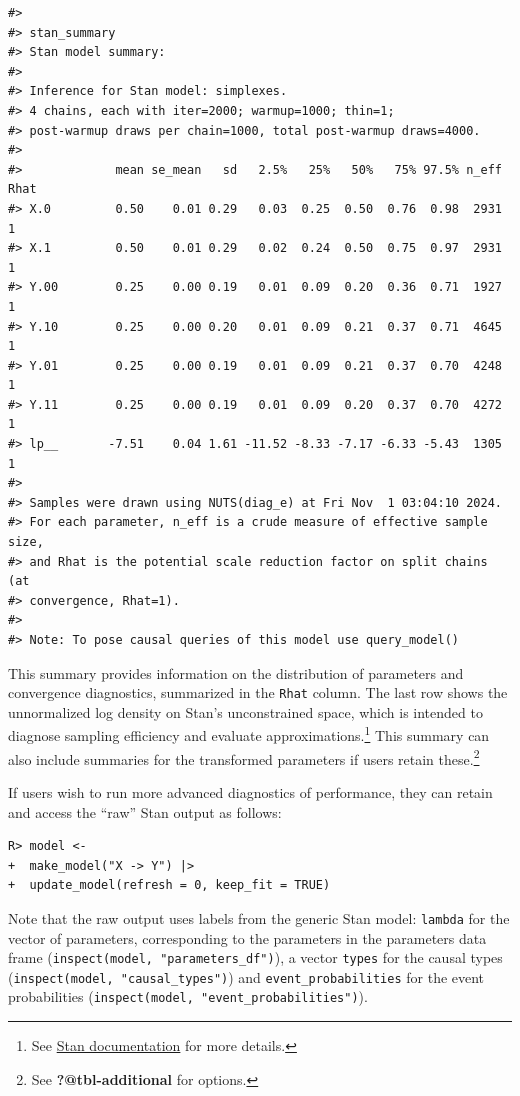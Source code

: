 \documentclass[
  11pt,
  article]{jss}
\begin{document}
\begin{verbatim}
#> 
#> stan_summary
#> Stan model summary:
#> 
#> Inference for Stan model: simplexes.
#> 4 chains, each with iter=2000; warmup=1000; thin=1; 
#> post-warmup draws per chain=1000, total post-warmup draws=4000.
#> 
#>             mean se_mean   sd   2.5%   25%   50%   75% 97.5% n_eff Rhat
#> X.0         0.50    0.01 0.29   0.03  0.25  0.50  0.76  0.98  2931    1
#> X.1         0.50    0.01 0.29   0.02  0.24  0.50  0.75  0.97  2931    1
#> Y.00        0.25    0.00 0.19   0.01  0.09  0.20  0.36  0.71  1927    1
#> Y.10        0.25    0.00 0.20   0.01  0.09  0.21  0.37  0.71  4645    1
#> Y.01        0.25    0.00 0.19   0.01  0.09  0.21  0.37  0.70  4248    1
#> Y.11        0.25    0.00 0.19   0.01  0.09  0.20  0.37  0.70  4272    1
#> lp__       -7.51    0.04 1.61 -11.52 -8.33 -7.17 -6.33 -5.43  1305    1
#> 
#> Samples were drawn using NUTS(diag_e) at Fri Nov  1 03:04:10 2024.
#> For each parameter, n_eff is a crude measure of effective sample size,
#> and Rhat is the potential scale reduction factor on split chains (at 
#> convergence, Rhat=1).
#> 
#> Note: To pose causal queries of this model use query_model()
\end{verbatim}

This summary provides information on the distribution of parameters and
convergence diagnostics, summarized in the \texttt{Rhat} column. The
last row shows the unnormalized log density on Stan's unconstrained
space, which is intended to diagnose sampling efficiency and evaluate
approximations.\footnote{See
  \href{https://mc-stan.org/cmdstanr/reference/fit-method-lp.html}{Stan
  documentation} for more details.} This summary can also include
summaries for the transformed parameters if users retain
these.\footnote{See \textbf{?@tbl-additional} for options.}

If users wish to run more advanced diagnostics of performance, they can
retain and access the ``raw'' Stan output as follows:

\begin{verbatim}
R> model <- 
+  make_model("X -> Y") |> 
+  update_model(refresh = 0, keep_fit = TRUE)
\end{verbatim}

Note that the raw output uses labels from the generic Stan model:
\texttt{lambda} for the vector of parameters, corresponding to the
parameters in the parameters data frame
(\texttt{inspect(model,\ "parameters\_df")}), a vector \texttt{types}
for the causal types (\texttt{inspect(model,\ "causal\_types")}) and
\texttt{event\_probabilities} for the event probabilities
(\texttt{inspect(model,\ "event\_probabilities")}).
\end{document}
